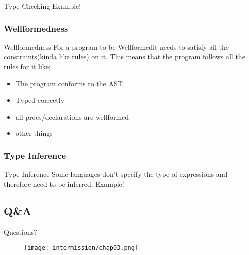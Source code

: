 \begin{frame}{Type Checking}
    Example!

\end{frame}

\subsubsection*{Wellformedness}
\begin{frame}{Wellformedness}
    For a program to be Wellformedit needs to satisfy all the constraints(kinda like rules) on it. This
    means that the program follows all the rules for it like;
    \begin{itemize}
        \item The program conforms to the AST
        \item Typed correctly
        \item all procs/declarations are wellformed
        \item other things
    \end{itemize}
\end{frame}

\subsubsection*{Type Inference}
\begin{frame}{Type Inference}
    Some languages don't specify the type of expressions and therefore need to be inferred.
    Example!
\end{frame}
\subsection*{Q\&A}
\begin{frame}{Questions?}
    \begin{figure}
        \centering
        \texttt{[image: intermission/chap03.png]}
    \end{figure}
\end{frame}